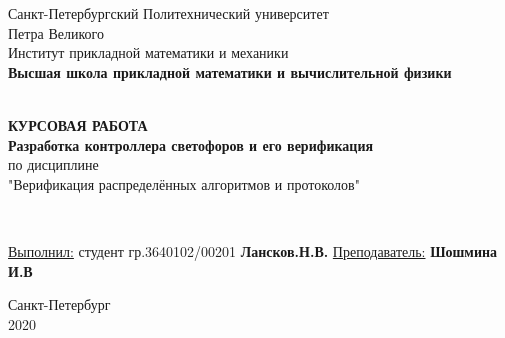 \documentclass[12pt]{article}
\begin{document}
\begin{titlepage}
	\center
		Санкт-Петербургский Политехнический
		университет \\ Петра Великого\\
		Институт прикладной математики и механики
		\\ \textbf{Высшая школа прикладной математики и вычислительной физики}

	\vfill ~
	\textbf{
		\\ \large КУРСОВАЯ РАБОТА \\
        Разработка контроллера светофоров и его верификация
	}
	\\ по дисциплине
	\\ "Верификация распределённых алгоритмов и протоколов"

	\vfill ~

    \begin{flushleft}
    \underline{Выполнил:}  \hspace{\fill} студент гр.3640102/00201 \textbf{Лансков.Н.В.} \linebreak[2]
    \underline{Преподаватель:} \hspace{\fill} \textbf{Шошмина И.В} \\
    \end{flushleft}

\vfill

{\large}	Санкт-Петербург
\\ 2020
\end{titlepage}
\end{document}
